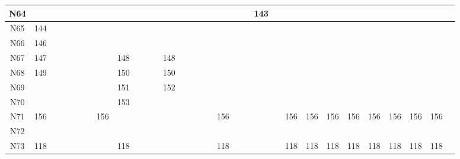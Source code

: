 \documentclass[11pt,a4paper]{article}
\begin{document}
\begin{lrbox}{\lltablebox}
\begin{tabular}{|*{31}{c|}}
N64 &  &  &  &  &  &  &  &  &  &  &  &  &  &  &  &  &  &  &  & 143 &  &  &  &  &  &  &  &  &  &  \\ \hline
N65 & 144 &  &  &  &  &  &  &  &  &  &  &  &  &  &  &  &  &  &  &  &  &  &  &  &  &  &  &  &  &  \\ \hline
N66 & 146 &  &  &  &  &  &  &  &  &  &  &  &  &  &  &  &  &  &  &  &  &  &  &  &  &  &  &  &  &  \\ \hline
N67 & 147 &  &  &  &  &  &  & 148 &  &  &  & 148 &  &  &  &  &  &  &  &  &  &  &  &  &  &  &  &  &  &  \\ \hline
N68 & 149 &  &  &  &  &  &  & 150 &  &  &  & 150 &  &  &  &  &  &  &  &  &  &  &  &  &  &  &  &  &  &  \\ \hline
N69 &  &  &  &  &  &  &  & 151 &  &  &  & 152 &  &  &  &  &  &  &  &  &  &  &  &  &  &  &  &  &  &  \\ \hline
N70 &  &  &  &  &  &  &  & 153 &  &  &  &  &  &  &  &  &  &  &  &  &  &  &  &  &  &  &  &  &  &  \\ \hline
N71 & 156 &  &  &  &  &  & 156 &  &  &  &  &  &  &  &  &  & 156 &  &  &  &  & 156 & 156 & 156 & 156 & 156 & 156 & 156 & 156 &  \\ \hline
N72 &  &  &  &  &  &  &  &  &  &  &  &  &  &  &  &  &  &  &  &  &  &  &  &  &  &  &  &  &  &  \\ \hline
N73 & 118 &  &  &  &  &  &  & 118 &  &  &  &  &  &  &  &  & 118 &  &  &  &  & 118 & 118 & 118 & 118 & 118 & 118 & 118 & 118 &  \\ \hline
\end{tabular}
\end{lrbox}
\noindent
\ifdim\wd\lltablebox>\linewidth
  \resizebox{\linewidth}{!}{\usebox{\lltablebox}}%
\else
  \usebox{\lltablebox}%
\fi\par
\clearpage
\end{document}
